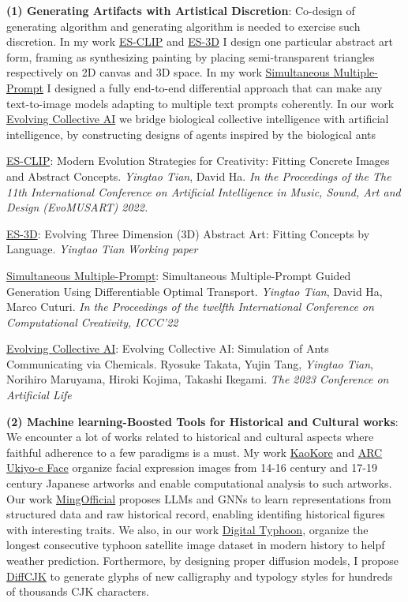 \documentclass[line,margin]{cv}
\begin{document}
\begin{resume}
  \textbf{(1) Generating Artifacts with Artistical Discretion}:  Co-design of generating algorithm and generating algorithm is needed to exercise such discretion.
  In my work \underline{ES-CLIP} and \underline{ES-3D} I {design one particular abstract art} form, framing as synthesizing painting by placing semi-transparent triangles respectively on 2D canvas and 3D space. In my work \underline{Simultaneous Multiple-Prompt} I designed a fully end-to-end differential approach that can make any text-to-image models adapting to {multiple text prompts coherently}. In our work \underline{Evolving Collective AI} we bridge {biological collective intelligence} with artificial intelligence, by constructing {designs of agents} inspired by the biological ants

  \underline{ES-CLIP}: {Modern Evolution Strategies for Creativity: Fitting Concrete Images and Abstract Concepts}.
  \emph{Yingtao Tian}, David Ha.
  \emph{In the Proceedings of the The 11th International Conference on Artificial Intelligence in Music, Sound, Art and Design (EvoMUSART) 2022.}

  \underline{ES-3D}: {Evolving Three Dimension (3D) Abstract Art: Fitting Concepts by Language}.
  \emph{Yingtao Tian} \emph{Working paper}

  \underline{Simultaneous Multiple-Prompt}: {Simultaneous Multiple-Prompt Guided Generation Using Differentiable Optimal Transport}.
  \emph{Yingtao Tian}, David Ha, Marco Cuturi. \emph{In the Proceedings of the twelfth International Conference on Computational Creativity, ICCC'22}

  \underline{Evolving Collective AI}: {Evolving Collective AI: Simulation of Ants Communicating via Chemicals}.
  Ryosuke Takata, Yujin Tang, \emph{Yingtao Tian}, Norihiro Maruyama, Hiroki Kojima, Takashi Ikegami. \emph{The 2023 Conference on Artificial Life}

  \textbf{(2) Machine learning-Boosted Tools for Historical and Cultural works}:   We encounter a lot of works related to historical and cultural aspects where faithful adherence to a few paradigms is a must.
  My work \underline{KaoKore} and \underline{ARC Ukiyo-e Face} organize {facial expression images} from 14-16 century and 17-19 century Japanese artworks and enable {computational analysis} to such artworks. Our work \underline{MingOfficial} proposes LLMs and GNNs to learn representations from structured data and raw historical record, enabling {identifing historical figures} with interesting traits.
  We also, in our work \underline{Digital Typhoon}, organize the longest consecutive typhoon satellite image dataset in modern history to helpf {weather prediction}. 
  Forthermore, by designing proper diffusion models, I propose \underline{DiffCJK} to {generate glyphs of new calligraphy and typology styles} for hundreds of thousands CJK characters.


\end{resume}
\end{document}
